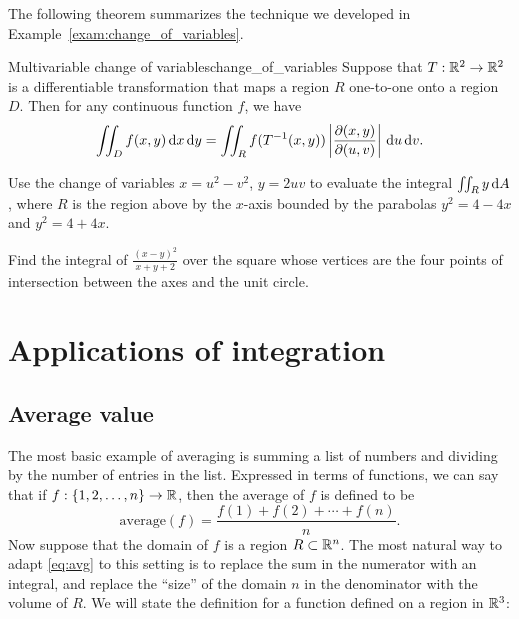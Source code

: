 \documentclass{watsonbook}
\begin{document}
    The following theorem summarizes the technique we developed in
    Example~\ref{exam:change_of_variables}. 

  \begin{theo}{Multivariable change of variables}{change_of_variables}
    Suppose that $T: \mathbb{R}^2 \to \mathbb{R}^2$ is a differentiable transformation
    that maps a region $R$ one-to-one onto a region $D$. Then for any
    continuous function $f$, we have 
    \[
      \iint_D f(x,y) \, \mathrm{d} x\, \mathrm{d} y = \iint_R f(T^{-1}(x,y)) \left|
        \frac{\partial (x,y)}{\partial (u,v)} \right| \, {\mathrm{d}}u \, {\mathrm{d}}v. 
    \]
  \end{theo}

  \begin{exercise}{}{}
    Use the change of variables $x = u^2 - v^2$, $y = 2uv$ to evaluate the
integral $\iint_R y \,\mathrm{d} A$, where $R$ is the region above by the $x$-axis
bounded by the parabolas $y^2 = 4-4x$ and $y^2 = 4+4x$. 
\end{exercise}

\begin{exercise}{}{}
  Find the integral of $\frac{(x-y)^2}{x+y+2}$ over the square whose
  vertices are the four points of intersection between the axes and
  the unit circle.
\end{exercise}

\section{Applications of integration} \label{sec:applications}

\subsection{Average value}

The most basic example of averaging is summing a list of numbers and dividing by the number of entries in the list. Expressed in terms of functions, we can say that if $f:\{1,2,\ldots,n\} \rightarrow \mathbb{R}$, then the average of $f$ is defined to be 
\begin{equation} \label{eq:avg} 
  \mathrm{average}(f) = \frac{f(1) + f(2) + \cdots + f(n)}{n}. 
\end{equation}
Now suppose that the domain of $f$ is a region $R\subset \mathbb{R}^n$. The most natural way to adapt \eqref{eq:avg} to this setting is to replace the sum in the numerator with an integral, and replace the ``size'' of the domain $n$ in the denominator with the volume of $R$. We will state the definition for a function defined on a region in $\mathbb{R}^3$: 
\end{document}

